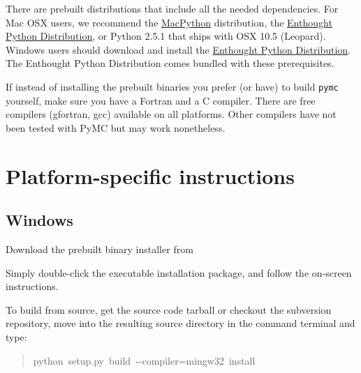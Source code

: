There are prebuilt distributions that include all the needed dependencies. For 
Mac OSX users, we recommend the \href{http://www.activestate.com/Products/ActivePython/}{MacPython} distribution, the 
\href{http://www.enthought.com/products/epddownload.php}{Enthought Python Distribution}, or Python 2.5.1 that ships with 
OSX 10.5 (Leopard). Windows users should download and install the 
\href{http://www.enthought.com/products/epddownload.php}{Enthought Python Distribution}. The Enthought Python Distribution comes 
bundled with these prerequisites.

If instead of installing the prebuilt binaries you prefer (or have) to build 
\texttt{pymc} yourself, make sure you have a Fortran and a C compiler. There are free
compilers (gfortran, gcc) available on all platforms. Other compilers have not been
tested with PyMC but may work nonetheless.



\hypertarget{platform-specific-instructions}{}
\section*{Platform-specific instructions}



\hypertarget{windows}{}
\subsection*{Windows}
\begin{list}{.}
{
\setlength{\rightmargin}{\leftmargin}
}
\item {} 
Download the prebuilt binary installer from

\item {} 
Simply double-click the executable installation package, and follow the on-screen instructions.

\end{list}

To build from source, get the source code tarball or checkout the subversion
repository, move into the resulting source directory in the command terminal 
and type:
\begin{quote}{\ttfamily \raggedright \noindent
python~setup.py~build~-{}-compiler=mingw32~install
}\end{quote}

